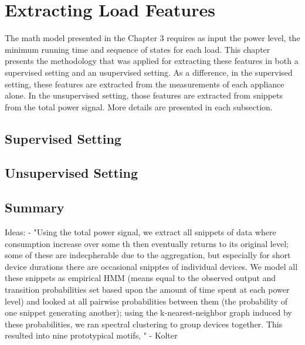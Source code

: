 \chapter{Extracting Load Features}
The math model presented in the Chapter 3 requires as input the power level, the minimum running time and sequence of states for each load. This chapter presents the methodology that was applied for extracting these features in both a supervised setting and an usupervised setting. As a difference, in the supervised setting, these features are extracted from the measurements of each appliance alone. In the unsupervised setting, those features are extracted from snippets from the total power signal. More details are presented in each subsection. 


\section{Supervised Setting}

\section{Unsupervised Setting}


\section{Summary}

Ideas:
- "Using the total power signal, we extract all snippets of data where consumption increase over some th then eventually returns to its original level; some of these are indecpherable due to the aggregation, but especially for short device durations there are occasional snipptes of individual devices. We model all these snippets as empirical HMM (means equal to the observed output and transition probabilities set based upon the amount of time spent at each power level) and looked at all pairwise probabilities between them (the probability of one snippet generating another); using the k-nearest-neighbor graph induced by these probabilities, we ran spectral clustering to group devices together. This resulted into nine prototypical motifs, " - Kolter